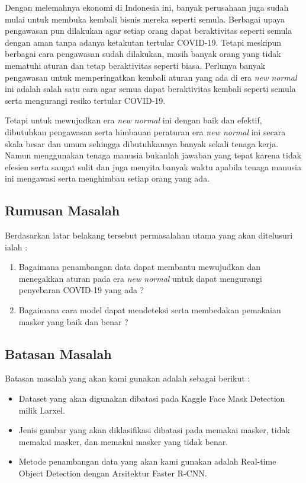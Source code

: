 \documentclass{article}
\begin{document}
	  	\par Dengan melemahnya ekonomi di Indonesia ini, banyak perusahaan juga sudah mulai untuk membuka kembali bisnis mereka seperti semula. Berbagai upaya pengawasan pun dilakukan agar setiap orang dapat beraktivitas seperti semula dengan aman tanpa adanya ketakutan tertular COVID-19. Tetapi meskipun berbagai cara pengawasan sudah dilakukan, masih banyak orang yang tidak mematuhi aturan dan tetap beraktivitas seperti biasa. Perlunya banyak pengawasan untuk memperingatkan kembali aturan yang ada di era \textit{new normal} ini adalah salah satu cara agar semua dapat beraktivitas kembali seperti semula serta mengurangi resiko tertular COVID-19.
	  	
	  	\par Tetapi untuk mewujudkan era \textit{new normal} ini dengan baik dan efektif, dibutuhkan pengawasan serta himbauan peraturan era \textit{new normal} ini secara skala besar dan umum sehingga dibutuhkannya banyak sekali tenaga kerja. Namun menggunakan tenaga manusia bukanlah jawaban yang tepat karena tidak efesien serta sangat sulit dan juga menyita banyak waktu apabila tenaga manusia ini mengawasi serta menghimbau setiap orang yang ada.
  	\subsection{Rumusan Masalah}
  		Berdasarkan latar belakang tersebut permasalahan utama yang akan ditelusuri ialah :
  		\begin{enumerate}
  			\item Bagaimana penambangan data dapat membantu mewujudkan dan menegakkan aturan pada era \textit{new normal} untuk dapat mengurangi penyebaran COVID-19 yang ada ?
  			\item Bagaimana cara model dapat mendeteksi serta membedakan pemakaian masker yang baik dan benar ?

  		\end{enumerate}
  	\subsection{Batasan Masalah}
  		Batasan masalah yang akan kami gunakan adalah sebagai berikut :
  		\begin{itemize}
  			\item Dataset yang akan digunakan dibatasi pada Kaggle Face Mask Detection milik Larxel\cite{larxel_2020}.
  			\item Jenis gambar yang akan diklasifikasi dibatasi pada memakai masker, tidak memakai masker, dan memakai masker yang tidak benar.
  			\item Metode penambangan data yang akan kami gunakan adalah Real-time Object Detection dengan Arsitektur Faster R-CNN\cite{NIPS2015_14bfa6bb}.
  		\end{itemize}
\end{document}
